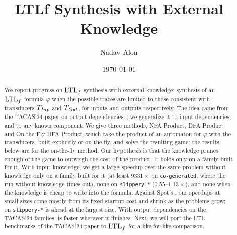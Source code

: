 \documentclass[11pt]{article}
\title{LTLf Synthesis with External Knowledge}
\author{Nadav Alon}
\date{\today}
\theoremstyle{plain}
\theoremstyle{definition}
\theoremstyle{remark}
\begin{document}
\maketitle

\begin{abstract}
We report progress on $\text{LTL}_f$ synthesis with external knowledge: synthesis of an $\text{LTL}_f$ formula $\varphi$ when the possible traces are limited to those consistent with transducers $T_{\mathit{Inp}}$ and $T_{\mathit{Out}}$, for inputs and outputs respectively.
The idea came from the TACAS'24 paper on output dependencies~\cite{AkshayBCF2024}; we generalize it to input dependencies, and to any known component.
We give three methods, NFA Product, DFA Product and On-the-Fly DFA Product, which take the product of an automaton for $\varphi$ with the transducers, built explicitly or on the fly, and solve the resulting game; the results below are for the on-the-fly method.
Our hypothesis is that the knowledge prunes enough of the game to outweigh the cost of the product.
It holds only on a family built for it.
With input knowledge, we get a large speedup over the same problem without knowledge only on a family built for it (at least $9331\times$ on \texttt{co-generated}, where the run without knowledge times out), none on \texttt{slippery-*} ($0.55$--$1.13\times$), and none when the knowledge is cheap to write into the formula.
Against Spot's , our speedups at small sizes come mostly from its fixed startup cost and shrink as the problems grow; on \texttt{slippery-*}  is ahead at the largest size.
With output dependencies on the TACAS'24 families,  is faster wherever it finishes.
Next, we will port the LTL benchmarks of the TACAS'24 paper to $\text{LTL}_f$ for a like-for-like comparison.
\end{abstract}

\tableofcontents
\newpage













\end{document}
